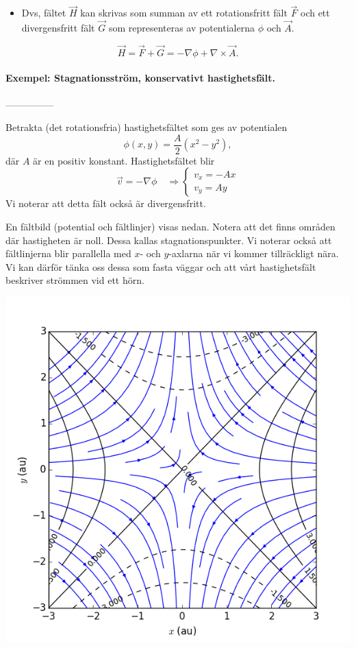 \documentclass[%
oneside,                 %
final,                   %
10pt]{article}
\begin{document}
\begin{itemize}
\item Dvs, fältet $\vec{H}$ kan skrivas som summan av ett rotationsfritt fält $\vec{F}$ och ett divergensfritt fält $\vec{G}$ som representeras av potentialerna $\phi$ och $\vec{A}$.
\end{itemize}

\noindent
$$
\vec{H} = \vec{F} + \vec{G} = -\nabla \phi + \nabla \times \vec{A}.
$$

\paragraph{Exempel: Stagnationsström, konservativt hastighetsfält.}
---------------

Betrakta (det rotationsfria) hastighetsfältet som ges av potentialen
$$
\phi(x,y) = \frac{A}{2}(x^2 - y^2),
$$
där $A$ är en positiv konstant. Hastighetsfältet blir
$$
\vec{v} = -\nabla \phi \quad \Rightarrow 
\left\{
\begin{array}{l}
v_x = -A x \\
v_y = A y
\end{array}
\right.
$$
Vi noterar att detta fält också är divergensfritt. 

En fältbild (potential och fältlinjer) visas nedan. Notera att det finns områden där hastigheten är noll. Dessa kallas stagnationspunkter. Vi noterar också att fältlinjerna blir parallella med $x$- och $y$-axlarna när vi kommer tillräckligt nära. Vi kan därför tänka oss dessa som fasta väggar och att vårt hastighetsfält beskriver strömmen vid ett hörn.



\centerline{\includegraphics[width=0.8\linewidth]{fig/stagnation_fieldplot.png}}
\end{document}
